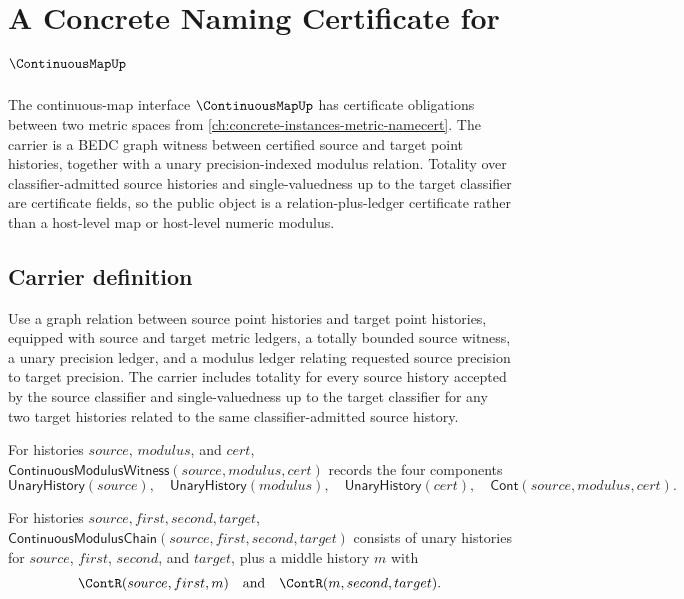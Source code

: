 \chapter{A Concrete Naming Certificate for $\ContinuousMapUp$}
\label{ch:concrete-instances-continuous-namecert}

The continuous-map interface $\ContinuousMapUp$ has certificate obligations between two metric spaces from \autoref{ch:concrete-instances-metric-namecert}. The carrier is a BEDC graph witness between certified source and target point histories, together with a unary precision-indexed modulus relation. Totality over classifier-admitted source histories and single-valuedness up to the target classifier are certificate fields, so the public object is a relation-plus-ledger certificate rather than a host-level map or host-level numeric modulus.

\section{Carrier definition}

\begin{definition}
\label{def:continuous-carrier}
Use a graph relation between source point histories and target point histories, equipped with source and target metric ledgers, a totally bounded source witness, a unary precision ledger, and a modulus ledger relating requested source precision to target precision. The carrier includes totality for every source history accepted by the source classifier and single-valuedness up to the target classifier for any two target histories related to the same classifier-admitted source history.
\end{definition}

\begin{definition}
\label{def:continuous-modulus-witness}
For histories $source$, $modulus$, and $cert$,
$\mathsf{ContinuousModulusWitness}(source,modulus,cert)$ records the four
components
$$
\mathsf{UnaryHistory}(source),\quad
\mathsf{UnaryHistory}(modulus),\quad
\mathsf{UnaryHistory}(cert),\quad
\mathsf{Cont}(source,modulus,cert).
$$
\end{definition}

\begin{definition}
\label{def:continuous-modulus-chain}
For histories $source,first,second,target$,
$\mathsf{ContinuousModulusChain}(source,first,second,target)$ consists of unary
histories for $source$, $first$, $second$, and $target$, plus a middle history
$m$ with
$$
\ContR(source,first,m)\quad\hbox{and}\quad\ContR(m,second,target).
$$
\end{definition}

